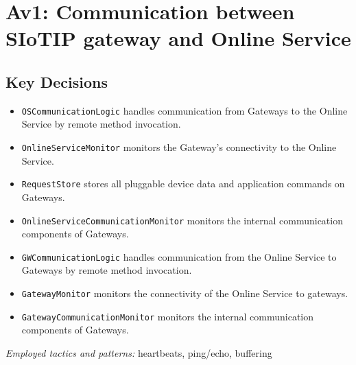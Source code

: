\section{Av1: Communication between SIoTIP gateway and Online Service}

    \subsection*{Key Decisions}

        \begin{itemize}
            \item \texttt{OSCommunicationLogic} handles communication from Gateways to the Online Service by remote method invocation.
        	\item \texttt{OnlineServiceMonitor} monitors the Gateway's connectivity to the Online Service.
            \item \texttt{RequestStore} stores all pluggable device data and application commands on Gateways.
        	\item \texttt{OnlineServiceCommunicationMonitor} monitors the internal communication components of Gateways.

            \item \texttt{GWCommunicationLogic} handles communication from the Online Service to Gateways by remote method invocation.
        	\item \texttt{GatewayMonitor} monitors the connectivity of the Online Service to gateways.
        	\item \texttt{GatewayCommunicationMonitor} monitors the internal communication components of Gateways.
        \end{itemize}
        \emph{Employed tactics and patterns:} heartbeats, ping/echo, buffering


